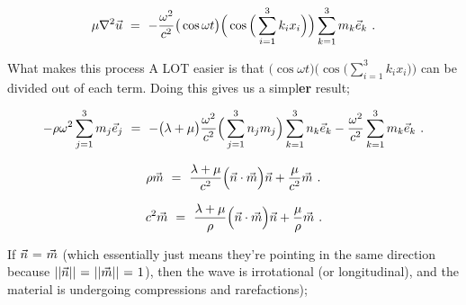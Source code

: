 \documentclass{article}
\begin{document}
\begin{equation} \label{eq:1}
\mu \nabla{}^2 \vec{u} \hspace{0.125cm} = \hspace{0.125cm} - \frac{\omega{}^2}{c^2} \big( \cos{ \omega t } \big) \Big( \cos \Big( \sum_{i = 1}^{3} k_i x_i \Big) \Big) \sum_{k = 1}^{3} m_k \vec{e}_k \hspace{0.125cm}  .
\end{equation}

What makes this process A LOT easier is that \begin{math}  \big( \cos{ \omega t } \big) \Big( \cos \Big( \sum_{i = 1}^{3} k_i x_i \Big) \Big) \end{math} can be divided out of each term. Doing this gives us a simpl\textbf{er} result;

\begin{equation} \label{eq:1}
 - \rho \omega{}^2 \sum_{j = 1}^{3} m_j \vec{e}_j \hspace{0.125cm} = \hspace{0.125cm} - \big( \lambda + \mu \big) \frac{\omega{}^2}{c^2} \Big( \sum_{j = 1}^{3} n_j m_j \Big) \sum_{k = 1}^{3} n_k \vec{e}_k - \frac{\omega{}^2}{c^2} \sum_{k = 1}^{3} m_k \vec{e}_k \hspace{0.125cm}  .
\end{equation}

\begin{equation} \label{eq:1}
\rho \vec{m} \hspace{0.125cm} = \hspace{0.125cm} \frac{\lambda + \mu}{c^2} \Big( \vec{n} \cdot \vec{m} \Big) \vec{n} + \frac{\mu}{c^2} \vec{m} \hspace{0.125cm}  .
\end{equation}

\begin{equation} \label{eq:1}
c^2 \vec{m} \hspace{0.125cm} = \hspace{0.125cm} \frac{\lambda + \mu}{\rho} \Big( \vec{n} \cdot \vec{m} \Big) \vec{n} + \frac{\mu}{\rho} \vec{m} \hspace{0.125cm}  .
\end{equation}

If \begin{math} \vec{n} \hspace{0.025cm} = \hspace{0.025cm} \vec{m} \end{math} (which essentially just means they're pointing in the same direction because  \begin{math} | | \vec{n} | | \hspace{0.025cm} = \hspace{0.025cm} | | \vec{m} | | \hspace{0.025cm} = \hspace{0.025cm} 1 \end{math}), then the wave is irrotational (or longitudinal), and the material is undergoing compressions and rarefactions);
\end{document}

